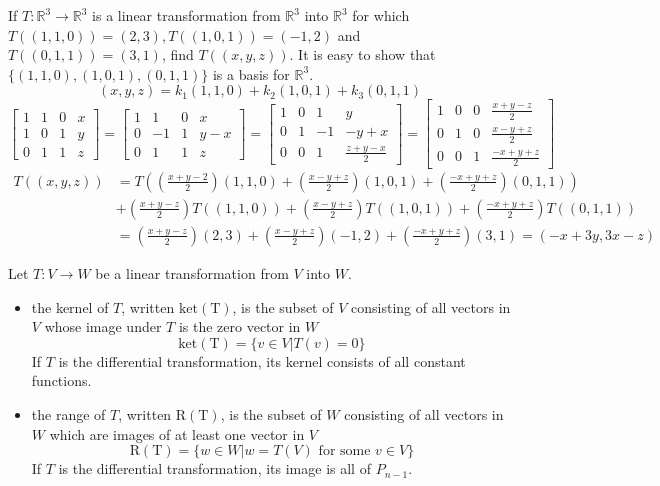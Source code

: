 \documentclass[12pt]{article}
\begin{document}
 \begin{example} If $T: \mathbb{R}^3 \to \mathbb{R}^3$ is a linear transformation from $\mathbb{R}^3$ into $\mathbb{R}^3$ for which $T((1, 1, 0)) = (2, 3), T((1, 0, 1)) = (-1, 2)$ and $T((0, 1, 1)) = (3, 1)$, find $T((x, y, z))$. \newline It is easy to show that $\{(1, 1, 0), (1, 0, 1), (0, 1, 1)\}$ is a basis for $\mathbb{R}^3$. $$(x, y, z)  = k_1(1, 1, 0) + k_2(1, 0, 1) + k_3(0, 1, 1) $$ $$\begin{bmatrix} 1 & 1 & 0 & x \\ 1 & 0 & 1 & y \\ 0 & 1 & 1 & z \end{bmatrix} = \begin{bmatrix} 1 & 1 & 0 & x \\ 0 & -1 & 1 & y - x \\ 0 & 1 & 1 & z \end{bmatrix} = \begin{bmatrix} 1 & 0 & 1 & y \\ 0 & 1 & -1 & -y + x \\ 0 & 0 & 1 & \frac{z + y - x}{2} \end{bmatrix} = \begin{bmatrix} 1 & 0 & 0 & \frac{x + y - z}{2} \\ 0 & 1 & 0 & \frac{x - y + z}{2} \\ 0 & 0 & 1 & \frac{-x + y + z}{2} \end{bmatrix} $$ $$\begin{aligned} T((x, y, z)) &= T((\frac{x + y - 2}{2})(1, 1, 0) + (\frac{x - y + z}{2})(1, 0, 1) + (\frac{-x + y + z}{2})(0, 1, 1)) \\ &+ (\frac{x + y - z}{2})T((1, 1, 0)) + (\frac{x - y + z}{2})T((1, 0, 1)) + (\frac{-x + y + z}{2})T((0, 1, 1)) \\ &= (\frac{x + y - z}{2})(2, 3) + (\frac{x - y + z}{2})(-1, 2) + (\frac{-x + y + z}{2})(3, 1) = (-x + 3y, 3x - z) \end{aligned} $$ \end{example} 
 \begin{definition} Let $T: V \to W$ be a linear transformation from $V$ into $W$. \begin{itemize} 
 \item the kernel of $T$, written $\mathrm{ket(T)}$, is the subset of $V$ consisting of all vectors in $V$ whose image under $T$ is the zero vector in $W$ $$\mathrm{ket(T)} = \{v \in V | T(v) = 0\}$$ If $T$ is the differential transformation, its kernel consists of all constant functions. 
 \item the range of $T$, written $\mathrm{R(T)}$, is the subset of $W$ consisting of all vectors in $W$ which are images of at least one vector in $V$ $$\mathrm{R(T)} = \{w \in W | w = T(V) \text{ for some } v \in V\}$$ If $T$ is the differential transformation, its image is all of $P_{n - 1}$. \end{itemize} \end{definition}
\end{document}
